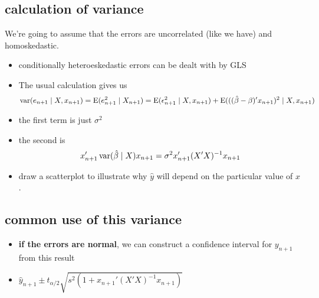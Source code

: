 \subsection{calculation of variance}

     We're going to assume that the errors are uncorrelated (like we
     have) and homoskedastic.
\begin{itemize}[leftmargin=0pt]
\item conditionally heteroeskedastic errors can be dealt with by GLS
\item The usual calculation gives us
  \[ \operatorname{var}(e_{n+1} \mid X, x_{n+1}) = \operatorname{E}(e_{n+1}^2 \mid X_{n+1}) = \operatorname{E}(\epsilon_{n+1}^2
  \mid X, x_{n+1}) + \operatorname{E}(((\hat{\beta} - \beta)'x_{n+1})^2 \mid X, x_{n+1})\]
\item the first term is just $\sigma^2$
\item the second is 
  \[ x_{n+1}' \operatorname{var}(\hat{\beta} \mid X) x_{n+1} = \sigma^2 x_{n+1}'(X'X)^{-1}x_{n+1}\]
\item draw a scatterplot to illustrate why $\hat y$ will depend on
       the particular value of $x$.
\end{itemize}

\subsection{common use of this variance}

\begin{itemize}[leftmargin=0pt]
\item \textbf{if the errors are normal}, we can construct a confidence
       interval for $y_{n+1}$ from this result
\item $\hat y_{n+1} \pm t_{\alpha/2} \sqrt{s^2 (1 + x_{n+1}'(X'X)^{-1}x_{n+1})}$
\end{itemize}

